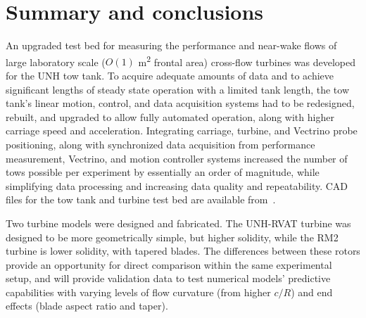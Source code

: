 \section{Summary and conclusions}

An upgraded test bed for measuring the performance and near-wake flows of large
laboratory scale ($O(1)$ m\textsuperscript{2} frontal area) cross-flow turbines
was developed for the UNH tow tank. To acquire adequate amounts of data and to
achieve significant lengths of steady state operation with a limited tank
length, the tow tank's linear motion, control, and data acquisition systems had
to be redesigned, rebuilt, and upgraded to allow fully automated operation,
along with higher carriage speed and acceleration. Integrating carriage,
turbine, and Vectrino probe positioning, along with synchronized data
acquisition from performance measurement, Vectrino, and motion controller
systems increased the number of tows possible per experiment by essentially an
order of magnitude, while simplifying data processing and increasing data
quality and repeatability. CAD files for the tow tank and turbine test bed are
available from~\cite{Bachant2016-tow-tank-CAD}.


Two turbine models were designed and fabricated. The UNH-RVAT turbine was
designed to be more geometrically simple, but higher solidity, while the RM2
turbine is lower solidity, with tapered blades. The differences between these
rotors provide an opportunity for direct comparison within the same experimental
setup, and will provide validation data to test numerical models' predictive
capabilities with varying levels of flow curvature (from higher $c/R$) and end
effects (blade aspect ratio and taper).
